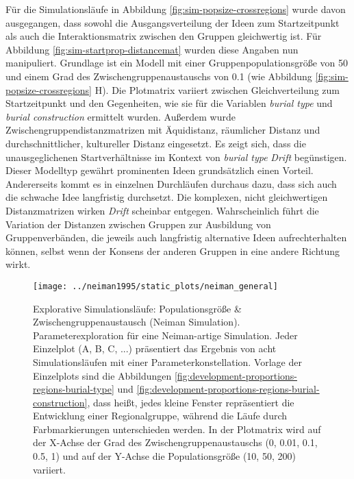 \documentclass[openany,twoside,twocolumn]{book}
\begin{document}
Für die Simulationsläufe in Abbildung \ref{fig:sim-popsize-crossregions}
wurde davon ausgegangen, dass sowohl die Ausgangsverteilung der Ideen
zum Startzeitpunkt als auch die Interaktionsmatrix zwischen den Gruppen
gleichwertig ist. Für Abbildung \ref{fig:sim-startprop-distancemat}
wurden diese Angaben nun manipuliert. Grundlage ist ein Modell mit einer
Gruppenpopulationsgröße von 50 und einem Grad des
Zwischengruppenaustauschs von 0.1 (wie Abbildung
\ref{fig:sim-popsize-crossregions} H). Die Plotmatrix variiert zwischen
Gleichverteilung zum Startzeitpunkt und den Gegenheiten, wie sie für die
Variablen \emph{burial type} und \emph{burial construction} ermittelt
wurden. Außerdem wurde Zwischengruppendistanzmatrizen mit Äquidistanz,
räumlicher Distanz und durchschnittlicher, kultureller Distanz
eingesetzt. Es zeigt sich, dass die unausgeglichenen Startverhältnisse
im Kontext von \emph{burial type} \emph{Drift} begünstigen. Dieser
Modelltyp gewährt prominenten Ideen grundsätzlich einen Vorteil.
Andererseits kommt es in einzelnen Durchläufen durchaus dazu, dass sich
auch die schwache Idee langfristig durchsetzt. Die komplexen, nicht
gleichwertigen Distanzmatrizen wirken \emph{Drift} scheinbar entgegen.
Wahrscheinlich führt die Variation der Distanzen zwischen Gruppen zur
Ausbildung von Gruppenverbänden, die jeweils auch langfristig
alternative Ideen aufrechterhalten können, selbst wenn der Konsens der
anderen Gruppen in eine andere Richtung wirkt.

\begin{figure}[!t]

{\centering \texttt{[image: ../neiman1995/static\_plots/neiman\_general]} 

}

\caption[Explorative Simulationsläufe: Populationsgröße \& Zwischengruppenaustausch (Neiman Simulation)]{Explorative Simulationsläufe: Populationsgröße \& Zwischengruppenaustausch (Neiman Simulation). Parameterexploration für eine Neiman-artige Simulation. Jeder Einzelplot (A, B, C, ...) präsentiert das Ergebnis von acht Simulationsläufen mit einer Parameterkonstellation. Vorlage der Einzelplots sind die Abbildungen \ref{fig:development-proportions-regions-burial-type} und \ref{fig:development-proportions-regions-burial-construction}, dass heißt, jedes kleine Fenster repräsentiert die Entwicklung einer Regionalgruppe, während die Läufe durch Farbmarkierungen unterschieden werden. In der Plotmatrix wird auf der X-Achse der Grad des Zwischengruppenaustauschs (0, 0.01, 0.1, 0.5, 1) und auf der Y-Achse die Populationsgröße (10, 50, 200) variiert.}\label{fig:neiman-general}
\end{figure}
\end{document}
